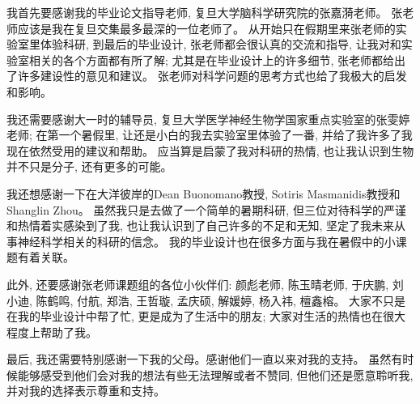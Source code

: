 \documentclass[a4paper, 12pt]{book}
\begin{document}
我首先要感谢我的毕业论文指导老师, 复旦大学脑科学研究院的张嘉漪老师。
张老师应该是我在复旦交集最多最深的一位老师了。
从开始只在假期里来张老师的实验室里体验科研, 到最后的毕业设计,
张老师都会很认真的交流和指导, 让我对和实验室相关的各个方面都有所了解;
尤其是在毕业设计上的许多细节, 张老师都给出了许多建设性的意见和建议。
张老师对科学问题的思考方式也给了我极大的启发和影响。

我还需要感谢大一时的辅导员, 复旦大学医学神经生物学国家重点实验室的张雯婷老师;
在第一个暑假里, 让还是小白的我去实验室里体验了一番,
并给了我许多了我现在依然受用的建议和帮助。
应当算是启蒙了我对科研的热情, 也让我认识到生物并不只是分子, 还有更多的可能。

我还想感谢一下在大洋彼岸的Dean Buonomano教授, Sotiris Masmanidis教授和Shanglin Zhou。
虽然我只是去做了一个简单的暑期科研, 但三位对待科学的严谨和热情着实感染到了我,
也让我认识到了自己许多的不足和无知, 坚定了我未来从事神经科学相关的科研的信念。
我的毕业设计也在很多方面与我在暑假中的小课题有着关联。

此外, 还要感谢张老师课题组的各位小伙伴们: 颜彪老师, 陈玉晴老师, 于庆鹏, 刘小迪,
陈鹤鸣, 付航, 郑浩, 王哲璇, 孟庆硕, 解媛婷, 杨入祎, 檀鑫榕。
大家不只是在我的毕业设计中帮了忙, 更是成为了生活中的朋友;
大家对生活的热情也在很大程度上帮助了我。

最后, 我还需要特别感谢一下我的父母。感谢他们一直以来对我的支持。
虽然有时候能够感受到他们会对我的想法有些无法理解或者不赞同,
但他们还是愿意聆听我, 并对我的选择表示尊重和支持。

\clearpage
\end{document}
